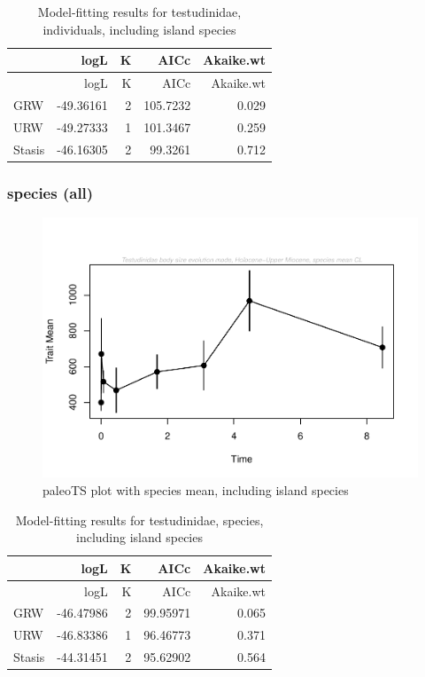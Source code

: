 \documentclass[]{article}
\begin{document}
\begin{longtable}[]{@{}lrrrr@{}}
\caption{Model-fitting results for testudinidae, individuals, including
island species}\tabularnewline
\toprule
& logL & K & AICc & Akaike.wt\tabularnewline
\midrule
\endfirsthead
\toprule
& logL & K & AICc & Akaike.wt\tabularnewline
\midrule
\endhead
GRW & -49.36161 & 2 & 105.7232 & 0.029\tabularnewline
URW & -49.27333 & 1 & 101.3467 & 0.259\tabularnewline
Stasis & -46.16305 & 2 & 99.3261 & 0.712\tabularnewline
\bottomrule
\end{longtable}

\newpage

\subsubsection{species (all)}\label{species-all}

\begin{figure}[htbp]
\centering
\includegraphics{MA_JJ_files/figure-latex/paleoTS plot with species mean, including island species-1.pdf}
\caption{paleoTS plot with species mean, including island species}
\end{figure}

\begin{longtable}[]{@{}lrrrr@{}}
\caption{Model-fitting results for testudinidae, species, including
island species}\tabularnewline
\toprule
& logL & K & AICc & Akaike.wt\tabularnewline
\midrule
\endfirsthead
\toprule
& logL & K & AICc & Akaike.wt\tabularnewline
\midrule
\endhead
GRW & -46.47986 & 2 & 99.95971 & 0.065\tabularnewline
URW & -46.83386 & 1 & 96.46773 & 0.371\tabularnewline
Stasis & -44.31451 & 2 & 95.62902 & 0.564\tabularnewline
\bottomrule
\end{longtable}
\end{document}

